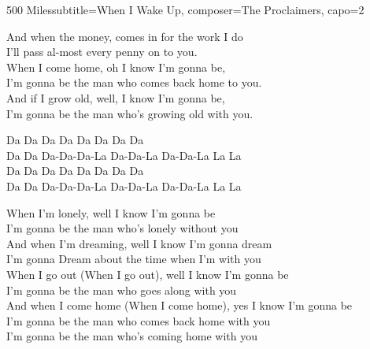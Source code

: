 \begin{song}{500 Miles}{subtitle={When I Wake Up}, composer={The Proclaimers}, capo={2}}
\begin{songVerse}
And when the money,    comes in for the work I do \\
I'll pass al-most every penny on to you. \\

When I come home, oh I know I'm gonna be, \\
I'm gonna be the man who comes back home to you. \\

And if I grow old, well, I know I'm gonna be, \\
I'm gonna be the man who's growing old with you. \\
\end{songVerse}

\begin{songChorus}\end{songChorus}

\begin{songBridge}
Da Da Da Da          Da Da Da Da \\

Da Da Da-Da-Da-La Da-Da-La Da-Da-La La La \\

Da Da Da Da           Da Da Da Da \\

Da Da Da-Da-Da-La Da-Da-La Da-Da-La La La \\
\end{songBridge}

\begin{songVerse}
When I'm lonely, well I know I'm gonna be \\
I'm gonna be the man who's lonely without you \\
And when I'm dreaming, well I know I'm gonna dream \\
I'm gonna Dream about the time when I'm with you \\

When I go out (When I go out), well I know I'm gonna be \\
I'm gonna be the man who goes along with you \\
And when I come home (When I come home), yes I know I'm gonna be \\
I'm gonna be the man who comes back home with you \\
I'm gonna be the man who's coming home with you \\
\end{songVerse}


\end{song}
